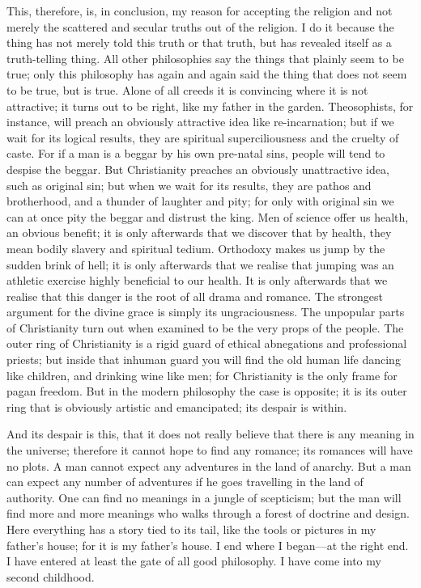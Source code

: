 \documentclass{book}
\begin{document}
This, therefore, is, in conclusion, my reason for accepting the religion and not merely the scattered and secular truths out of the religion. I do it because the thing has not merely told this truth or that truth, but has revealed itself as a truth-telling thing. All other philosophies say the things that plainly seem to be true; only this philosophy has again and again said the thing that does not seem to be true, but is true. Alone of all creeds it is convincing where it is not attractive; it turns out to be right, like my father in the garden. Theosophists, for instance, will preach an obviously attractive idea like re-incarnation; but if we wait for its logical results, they are spiritual superciliousness and the cruelty of caste. For if a man is a beggar by his own pre-natal sins, people will tend to despise the beggar. But Christianity preaches an obviously unattractive idea, such as original sin; but when we wait for its results, they are pathos and brotherhood, and a thunder of laughter and pity; for only with original sin we can at once pity the beggar and distrust the king. Men of science offer us health, an obvious benefit; it is only afterwards that we discover that by health, they mean bodily slavery and spiritual tedium. Orthodoxy makes us jump by the sudden brink of hell; it is only afterwards that we realise that jumping was an athletic exercise highly beneficial to our health. It is only afterwards that we realise that this danger is the root of all drama and romance. The strongest argument for the divine grace is simply its ungraciousness. The unpopular parts of Christianity turn out when examined to be the very props of the people. The outer ring of Christianity is a rigid guard of ethical abnegations and professional priests; but inside that inhuman guard you will find the old human life dancing like children, and drinking wine like men; for Christianity is the only frame for pagan freedom. But in the modern philosophy the case is opposite; it is its outer ring that is obviously artistic and emancipated; its despair is within.

And its despair is this, that it does not really believe that there is any meaning in the universe; therefore it cannot hope to find any romance; its romances will have no plots. A man cannot expect any adventures in the land of anarchy. But a man can expect any number of adventures if he goes travelling in the land of authority. One can find no meanings in a jungle of scepticism; but the man will find more and more meanings who walks through a forest of doctrine and design. Here everything has a story tied to its tail, like the tools or pictures in my father’s house; for it is my father’s house. I end where I began—at the right end. I have entered at least the gate of all good philosophy. I have come into my second childhood.
\end{document}
